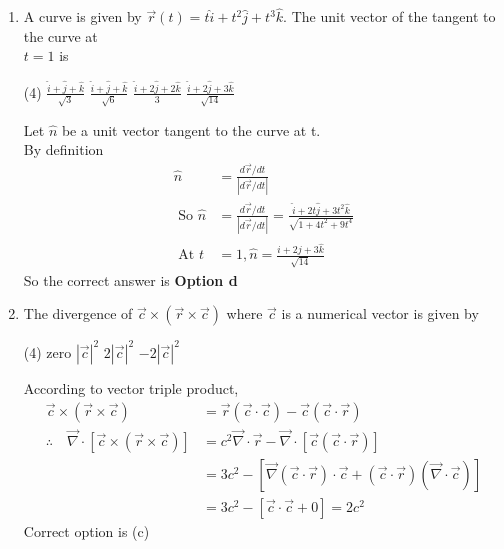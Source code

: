 \begin{enumerate}[label=\color{ocre}\textbf{\arabic*.}]
\item A curve is given by $\vec{r}(t)=t \hat{i}+t^{2} \hat{j}+t^{3} \hat{k}$. The unit vector of the tangent to the curve at\\$t=1$ is
\begin{tasks}(4)
	\task[\textbf{A.}] $\frac{\hat{i}+\hat{j}+\hat{k}}{\sqrt{3}}$
	\task[\textbf{B.}] $\frac{\hat{i}+\hat{j}+\hat{k}}{\sqrt{6}}$
	\task[\textbf{C.}] $\frac{\hat{i}+2 \hat{j}+2 \hat{k}}{3}$
	\task[\textbf{D.}] $\frac{\hat{i}+2 \hat{j}+3 \hat{k}}{\sqrt{14}}$
\end{tasks}
\begin{answer}
	Let $\hat{n}$ be a unit vector tangent to the curve at t.\\
	By definition  
	\begin{align*}
	\hat{n}&=\frac{d \vec{r} / d t}{|d \vec{r} / d t|}\\
	\text{ So } \hat{n}&=\frac{d \vec{r} / d t}{|d \vec{r} / d t|}=\frac{\hat{i}+2t \hat{j}+3 t^{2} \hat{k}}{\sqrt{1+4 t^{2}+9 t^{4}}}\\
	\text{ At } t&=1, \hat{n}=\frac{\hat{i}+2 j+3 \hat{k}}{\sqrt{14}}
	\end{align*}
	So the correct answer is \textbf{Option d}
\end{answer}
	\item The divergence of $\vec{c} \times(\vec{r} \times \vec{c})$ where $\vec{c}$ is a numerical vector is given by 

\begin{tasks}(4)
	\task[\textbf{A.}] zero
	\task[\textbf{B.}]  $|\vec{c}|^{2}$
	\task[\textbf{C.}] $2|\vec{c}|^{2}$
	\task[\textbf{D.}] $-2|\vec{c}|^{2}$
\end{tasks}
\begin{answer}
	According to vector triple product,
	\begin{align*} \vec{c} \times(\vec{r} \times \vec{c})&= \vec{r}(\vec{c} \cdot \vec{c})-\vec{c}(\vec{c} \cdot \vec{r}) \\ \therefore \quad \vec{\nabla} \cdot[\vec{c} \times(\vec{r} \times \vec{c})] &=c^{2} \vec{\nabla} \cdot \vec{r}-\vec{\nabla} \cdot[\vec{c}(\vec{c} \cdot \vec{r})] \\ &=3 c^{2}-[\vec{\nabla}(\vec{c} \cdot \vec{r}) \cdot \vec{c}+(\vec{c} \cdot \vec{r})(\vec{\nabla} \cdot \vec{c})] \\ &=3 c^{2}-[\vec{c} \cdot \vec{c}+0]=2 c^{2} \end{align*}
	Correct option is (c)
\end{answer}



\end{enumerate}
